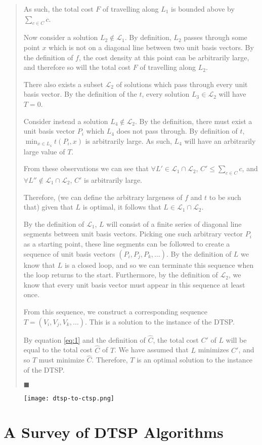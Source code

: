 \begin{quote}
  As such, the total cost $F$ of travelling along $L_1$ is bounded above by $\sum_{c\in C}c$.

  Now consider a solution $L_2 \notin \mathcal{L}_1$. By definition, $L_2$ passes through some point $x$ which is not on a diagonal line between two unit basis vectors. By the definition of $f$, the cost density at this point can be arbitrarily large, and therefore so will the total cost $F$ of travelling along $L_2$.

  There also exists a subset $\mathcal{L}_2$ of solutions which pass through every unit basis vector. By the definition of the $t$, every solution $L_3 \in \mathcal{L}_2$ will have $T=0$.

  Consider instead a solution $L_4 \notin \mathcal{L}_2$. By the definition, there must exist a unit basis vector $P_i$ which $L_4$ does not pass through. By definition of $t$, $\min_{x\in L_4} t(P_i, x)$ is arbitrarily large. As such, $L_4$ will have an arbitrarily large value of $T$.

  From these observations we can see that $\forall L' \in \mathcal{L}_1 \cap \mathcal{L}_2$, $C' \leq \sum_{c\in C}c$, and $\forall L'' \notin \mathcal{L}_1 \cap \mathcal{L}_2$, $C'$ is arbitrarily large.

  Therefore, (we can define the arbitrary largeness of $f$ and $t$ to be such that) given that $L$ is optimal, it follows that $L\in\mathcal{L}_1 \cap \mathcal{L}_2$.

  By the definition of $\mathcal{L}_1$, $L$ will consist of a finite series of diagonal line segments between unit basis vectors. Picking one such arbitrary vector $P_i$ as a starting point, these line segments can be followed to create a sequence of unit basis vectors $(P_i, P_j, P_k, \hdots)$. By the definition of $L$ we know that $L$ is a closed loop, and so we can terminate this sequence when the loop returns to the start. Furthermore, by the definition of $\mathcal{L}_2$, we know that every unit basis vector must appear in this sequence at least once.

  From this sequence, we construct a corresponding sequence $T = (V_i, V_j, V_k, \hdots)$. This is a solution to the instance of the DTSP.

  By equation \ref{eq:1} and the definition of $\hat{C}$, the total cost $C'$ of $L$ will be equal to the total cost $\hat{C}$ of $T$. We have assumed that $L$ minimizes $C'$, and so $T$ must minimize $\hat{C}$. Therefore, $T$ is an optimal solution to the instance of the DTSP.

  $\blacksquare$

\end{quote}

\begin{figure}[H]
  \centering
  \texttt{[image: dtsp-to-ctsp.png]}
  \caption{\todo[caption]}
  \label{fig:dtsp-to-ctsp}
\end{figure}

\section{A Survey of DTSP Algorithms}

